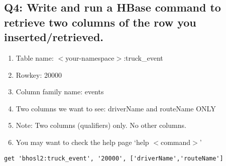 \documentclass[]{article}
\begin{document}
\subsection*{Q4: Write and run a HBase command to retrieve two columns of the row you inserted/retrieved.} 
\begin{enumerate}[before=\itshape,font=\normalfont,label=\alph*.]
	\item Table name: $<$your-namespace$>$:truck\_event
	\item Rowkey: 20000
	\item Column family name: events
	\item Two columns we want to see: driverName and routeName ONLY
	\item Note: Two columns (qualifiers) only. No other columns.
	\item You may want to check the help page ‘help $<$command$>$’
\end{enumerate}

\begin{verbatim}
get 'bhosl2:truck_event', '20000', ['driverName','routeName']
\end{verbatim}
\end{document}
